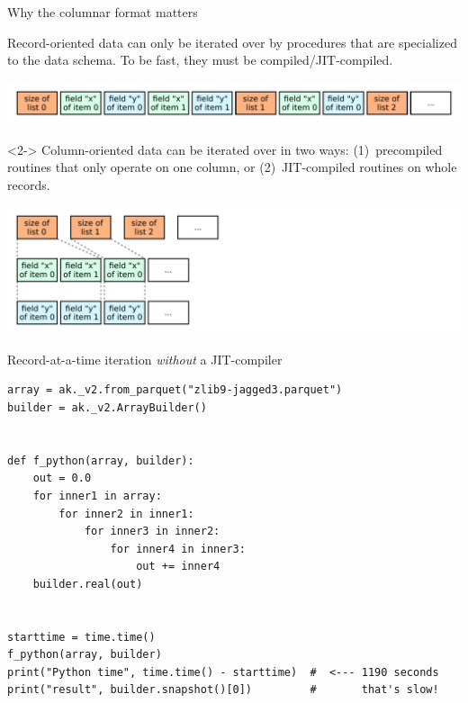 \documentclass[aspectratio=169]{beamer}
\begin{document}
\begin{frame}{Why the columnar format matters}
\vspace{0.35 cm}
\large

Record-oriented data can only be iterated over by procedures that are specialized to the data schema. To be fast, they must be compiled/JIT-compiled.

\includegraphics[width=\linewidth]{record-oriented.pdf}

\vspace{0.15 cm}
\begin{uncoverenv}<2->
Column-oriented data can be iterated over in two ways: (1)~precompiled routines that only operate on one column, or (2)~JIT-compiled routines on whole records.

\includegraphics[width=\linewidth]{column-oriented.pdf}
\end{uncoverenv}

\vspace{-4 cm}
\hfill \begin{minipage}{0.44\linewidth}

\vspace{0.25 cm}
\end{minipage}
\vspace{4 cm}
\end{frame}

\begin{frame}[fragile]{Record-at-a-time iteration {\it without} a JIT-compiler}
\vspace{0.1 cm}
\small
\begin{verbatim}
array = ak._v2.from_parquet("zlib9-jagged3.parquet")
builder = ak._v2.ArrayBuilder()


def f_python(array, builder):
    out = 0.0
    for inner1 in array:
        for inner2 in inner1:
            for inner3 in inner2:
                for inner4 in inner3:
                    out += inner4
    builder.real(out)


starttime = time.time()
f_python(array, builder)
print("Python time", time.time() - starttime)  #  <--- 1190 seconds
print("result", builder.snapshot()[0])         #       that's slow!
\end{verbatim}
\end{frame}
\end{document}
